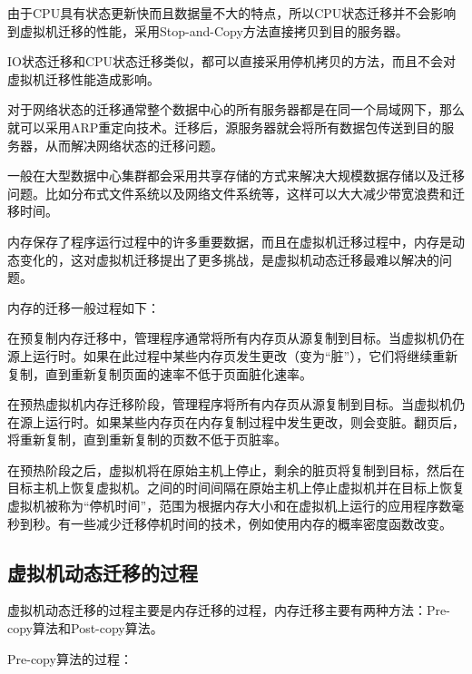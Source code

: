 由于CPU具有状态更新快而且数据量不大的特点，所以CPU状态迁移并不会影响到虚拟机迁移的性能，采用Stop-and-Copy方法直接拷贝到目的服务器。

IO状态迁移和CPU状态迁移类似，都可以直接采用停机拷贝的方法，而且不会对虚拟机迁移性能造成影响。

对于网络状态的迁移通常整个数据中心的所有服务器都是在同一个局域网下，那么就可以采用ARP重定向技术。迁移后，源服务器就会将所有数据包传送到目的服务器，从而解决网络状态的迁移问题。
           
一般在大型数据中心集群都会采用共享存储的方式来解决大规模数据存储以及迁移问题。比如分布式文件系统以及网络文件系统等，这样可以大大减少带宽浪费和迁移时间。

内存保存了程序运行过程中的许多重要数据，而且在虚拟机迁移过程中，内存是动态变化的，这对虚拟机迁移提出了更多挑战，是虚拟机动态迁移最难以解决的问题。

内存的迁移一般过程如下：

在预复制内存迁移中，管理程序通常将所有内存页从源复制到目标。当虚拟机仍在源上运行时。如果在此过程中某些内存页发生更改（变为“脏”），它们将继续重新复制，直到重新复制页面的速率不低于页面脏化速率。

在预热虚拟机内存迁移阶段，管理程序将所有内存页从源复制到目标。当虚拟机仍在源上运行时。如果某些内存页在内存复制过程中发生更改，则会变脏。翻页后，将重新复制，直到重新复制的页数不低于页脏率。

在预热阶段之后，虚拟机将在原始主机上停止，剩余的脏页将复制到目标，然后在目标主机上恢复虚拟机。之间的时间间隔在原始主机上停止虚拟机并在目标上恢复虚拟机被称为“停机时间”，范围为根据内存大小和在虚拟机上运行的应用程序数毫秒到秒。有一些减少迁移停机时间的技术，例如使用内存的概率密度函数改变。

\subsection{虚拟机动态迁移的过程}
虚拟机动态迁移的过程主要是内存迁移的过程，内存迁移主要有两种方法：Pre-copy算法和Post-copy算法\cite{Aidan}。

Pre-copy算法的过程：

